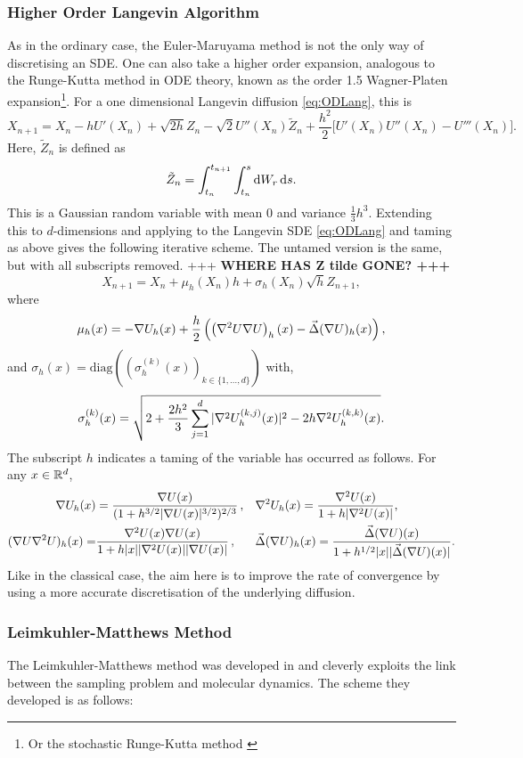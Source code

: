 \subsubsection{Higher Order Langevin Algorithm}
As in the ordinary case, the Euler-Maruyama method is not the only way of discretising an SDE. One can also take a higher order expansion, analogous to the Runge-Kutta method in ODE theory, known as the order 1.5 Wagner-Platen expansion\footnote{Or the stochastic Runge-Kutta method \cite{Schaffter10numericalintegration}}. For a one dimensional Langevin diffusion \eqref{eq:ODLang}, this is 
\[X_{n+1} = X_n -hU'(X_n)+\sqrt{2h}Z_n -\sqrt{2} U''(X_n) \tilde{Z}_n +\frac{ h^2 }{2}\bigg\lbrack U'(X_n)U''(X_n)-U'''(X_n)\bigg\rbrack.  \]
Here, \(\tilde{Z}_n\) is defined as
\[  \tilde{Z}_n = \int_{t_n}^{t_{n+1}} \int_{t_n}^s \mathop{}\!\mathrm{d} W_r \mathop{}\!\mathrm{d} s. \]
This is a Gaussian random variable with mean \(0\) and variance \(\frac{1}{3}h^3 \). Extending this to \(d\)-dimensions and applying to the Langevin SDE \eqref{eq:ODLang} and taming as above gives the following iterative scheme. The untamed version is the same, but with all subscripts removed. {+++ \bf WHERE HAS Z tilde GONE? +++}
\[X_{n+1} = X_n + \mu_{h}(X_n)h +\sigma_{h}(X_n)\sqrt{h}Z_{n+1},\]
where
\[\mu_{h}(x) = -\nabla U_{h}(x) +\frac{h}{2}\left( \left( \nabla^2U\nabla U\right)_{h}(x) - \vec{\Delta}(\nabla U)_{h}(x)\right) ,\]
and \(\sigma_{h}(x) = \text{diag}\left(\left( \sigma_{h}^{(k)}(x)\right)_{k\in \lbrace 1,\dots,d\rbrace}\right)\) with,
\[\sigma_{h}^{(k)}(x) = \sqrt{2+\frac{2h^2}{3}\sum_{j=1}^d |\nabla^2 U_{h}^{(k,j)}(x)|^2 - 2h \nabla^2 U_{h}^{(k,k)}(x)}.\]
The subscript \(h\) indicates a taming of the variable has occurred as follows. For any \(x\in \mathbb{R}^d\),
\begin{align*}
    \nabla U_h(x) &=\frac{\nabla U(x)}{(1+h^{3/2}|\nabla U(x)|^{3/2})^{2/3}}\, , && \nabla^2U_h(x) = \frac{\nabla^2 U(x)}{1+h|\nabla^2 U(x)|} ,\\
    (\nabla U\nabla^2U)_h(x) =&\frac{\nabla^2U(x)\nabla U(x)}{1+h|x||\nabla^2U(x)||\nabla U(x)|}\, , && \vec{\Delta}(\nabla U)_h(x) = \frac{\vec{\Delta}(\nabla U)(x)}{1+h^{1/2}|x||\vec{\Delta}(\nabla U)(x)|}.
\end{align*}
Like in the classical case, the aim here is to improve the rate of convergence by using a more accurate discretisation of the underlying diffusion.

\subsubsection{Leimkuhler-Matthews Method}
The Leimkuhler-Matthews method was developed in \cite{LM12} and cleverly exploits the link between the sampling problem and molecular dynamics. The scheme they developed is as follows:

